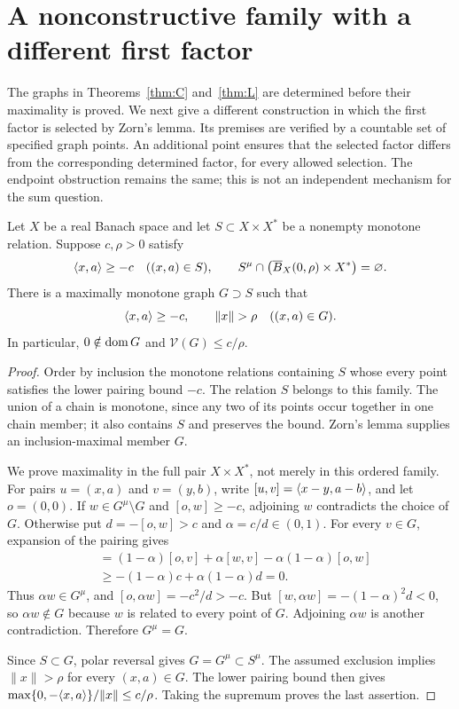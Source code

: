 \section{A nonconstructive family with a different first factor}
\label{sec:nonconstructive}
The graphs in Theorems~\ref{thm:C} and~\ref{thm:L} are determined before
their maximality is proved. We next give a different construction in which
the first factor is selected by Zorn's lemma. Its premises are verified
by a countable set of specified graph points. An additional point ensures that the
selected factor differs from the corresponding determined factor, for
every allowed selection. The endpoint obstruction remains the same;
this is not an independent mechanism for the sum question.

\begin{lemma}
\label{lem:capped-extension}
Let $X$ be a real Banach space and let $S\subset X\times X^*$ be a
nonempty monotone relation. Suppose $c,\rho>0$ satisfy
\[
\langle x,a\rangle\ge-c\quad((x,a)\in S),\qquad
S^\mu\cap\bigl(\overline B_X(0,\rho)\times X^*\bigr)=\varnothing.
\]
There is a maximally monotone graph $G\supset S$ such that
\[
\pair{x}{a}\ge-c,\qquad \|x\|>\rho\quad((x,a)\in G).
\]
In particular, $0\notin\operatorname{dom} G$ and $\mathcal V(G)\le c/\rho$.
\end{lemma}
\begin{proof}
Order by inclusion the monotone relations containing $S$ whose every point
satisfies the lower pairing bound $-c$. The relation $S$ belongs to this
family. The union of a chain is monotone, since any two of its points occur
together in one chain member; it also contains $S$ and preserves the
bound. Zorn's lemma supplies an inclusion-maximal member $G$.

We prove maximality in the full pair $X\times X^*$, not merely in this
ordered family. For pairs $u=(x,a)$ and $v=(y,b)$, write
$[u,v]=\langle x-y,a-b\rangle$, and let $o=(0,0)$. If
$w\in G^\mu\setminus G$ and $[o,w]\ge-c$, adjoining $w$ contradicts
the choice of $G$. Otherwise put $d=-[o,w]>c$ and $\alpha=c/d\in(0,1)$.
For every $v\in G$, expansion of the pairing gives
\begin{align*}
[\alpha w,v]
&=(1-\alpha)[o,v]+\alpha[w,v]-\alpha(1-\alpha)[o,w]\\
&\ge-(1-\alpha)c+\alpha(1-\alpha)d=0.
\end{align*}
Thus $\alpha w\in G^\mu$, and
$[o,\alpha w]=-c^2/d>-c$. But
$[w,\alpha w]=-(1-\alpha)^2d<0$, so $\alpha w\notin G$ because
$w$ is related to every point of $G$. Adjoining $\alpha w$ is another
contradiction. Therefore $G^\mu=G$.

Since $S\subset G$, polar reversal gives $G=G^\mu\subset S^\mu$.
The assumed exclusion implies $\|x\|>\rho$ for every $(x,a)\in G$. The lower
pairing bound then gives
$\max\{0,-\langle x,a\rangle\}/\|x\|\le c/\rho$. Taking the supremum
proves the last assertion.
\end{proof}

